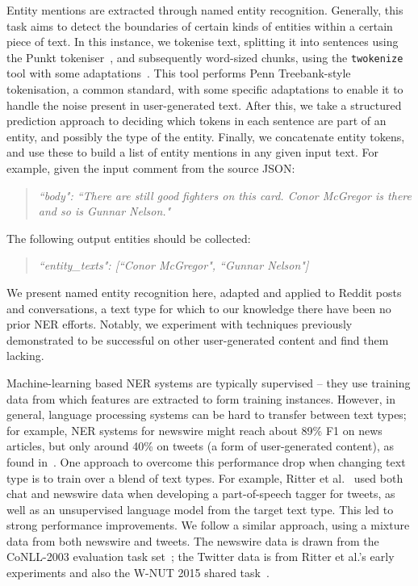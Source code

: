 \documentclass[sigconf]{acmart}
\begin{document}
Entity mentions are extracted through named entity recognition.
Generally, this task aims to detect the boundaries of certain kinds of entities within a certain piece of text.
In this instance, we tokenise text, splitting it into sentences using the Punkt tokeniser~\cite{kiss2006unsupervised}, and subsequently word-sized chunks, using the {\tt twokenize} tool with some adaptations~\cite{o2010tweetmotif}.
This tool performs Penn Treebank-style tokenisation, a common standard, with some specific adaptations to enable it to handle the noise present in user-generated text.
After this, we take a structured prediction approach to deciding which tokens in each sentence are part of an entity, and possibly the type of the entity.
Finally, we concatenate entity tokens, and use these to build a list of entity mentions in any given input text.
For example, given the input comment from the source JSON:

\begin{quote}
\emph{``body": ``There are still good fighters on this card. Conor McGregor is there and so is Gunnar Nelson."}
\end{quote}

The following output entities should be collected:

\begin{quote}
\emph{``entity\_texts": [``Conor McGregor", ``Gunnar Nelson"]}
\end{quote}

We present named entity recognition here, adapted and applied to Reddit posts and conversations, a text type for which to our knowledge there have been no prior NER efforts.
Notably, we experiment with techniques previously demonstrated to be successful on other user-generated content and find them lacking.

Machine-learning based NER systems are typically supervised -- they use training data from which features are extracted to form training instances.
However, in general, language processing systems can be hard to transfer between text types; for example, NER systems for newswire might reach about 89\% F1 on news articles, but only around 40\% on tweets (a form of user-generated content), as found in~\cite{derczynski2015analysis}.
One approach to overcome this performance drop when changing text type is to train over a blend of text types.
For example, Ritter et al.~\cite{ritter2011named} used both chat %
and newswire data when developing a part-of-speech tagger for tweets, as well as an unsupervised language model from the target text type.
This led to strong performance improvements.
We follow a similar approach, using a mixture data from both newswire and tweets.
The newswire data is drawn from the CoNLL-2003 evaluation task set~\cite{tjong2003introduction}; the Twitter data is from Ritter et al.'s early experiments and also the W-NUT 2015 shared task~\cite{ritter2011named,baldwin2015shared}.
\end{document}
